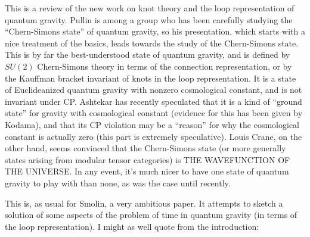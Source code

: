\documentclass{article}
\def\tightlist{}
\renewcommand{\texttt}[1]{%
  \begingroup
  \ttfamily
  \begingroup\lccode`~=`/\lowercase{\endgroup\def~}{/\discretionary{}{}{}}%
  \begingroup\lccode`~=`[\lowercase{\endgroup\def~}{[\discretionary{}{}{}}%
  \begingroup\lccode`~=`.\lowercase{\endgroup\def~}{.\discretionary{}{}{}}%
  \catcode`/=\active\catcode`[=\active\catcode`.=\active
  \scantokens{#1\noexpand}%
  \endgroup
}
\begin{document}

This is a review of the new work on knot theory and the loop
representation of quantum gravity. Pullin is among a group who has been
carefully studying the ``Chern-Simons state'' of quantum gravity, so his
presentation, which starts with a nice treatment of the basics, leads
towards the study of the Chern-Simons state. This is by far the
best-understood state of quantum gravity, and is defined by \(SU(2)\)
Chern-Simons theory in terms of the connection representation, or by the
Kauffman bracket invariant of knots in the loop representation. It is a
state of Euclideanized quantum gravity with nonzero cosmological
constant, and is not invariant under CP. Ashtekar has recently
speculated that it is a kind of ``ground state'' for gravity with
cosmological constant (evidence for this has been given by Kodama), and
that its CP violation may be a ``reason'' for why the cosmological
constant is actually zero (this part is extremely speculative). Louis
Crane, on the other hand, seems convinced that the Chern-Simons state
(or more generally states arising from modular tensor categories) is THE
WAVEFUNCTION OF THE UNIVERSE. In any event, it's much nicer to have one
state of quantum gravity to play with than none, as was the case until
recently.


This is, as usual for Smolin, a very ambitious paper. It attempts to
sketch a solution of some aspects of the problem of time in quantum
gravity (in terms of the loop representation). I might as well quote
from the introduction:
\end{document}
